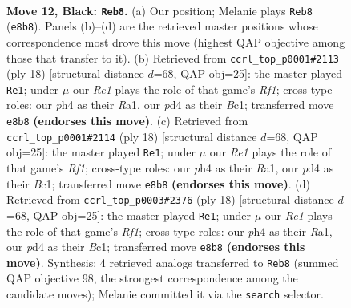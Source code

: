\documentclass[11pt]{article}
\begin{document}
\clearpage

\begin{figure}[p]\centering
\begin{subfigure}{0.46\textwidth}\centering
\resizebox{\linewidth}{!}{%
\newchessgame
\chessboard[
  setfen={r3r1k1/pppbqppp/2n1pn2/8/2BP3P/4PNP1/PP1B1P2/R2Q1RK1 b - - 2 12},
  showmover=false,
  pgfstyle=straightmove, color=movearrow, markmove={e8-b8}
]}
\caption{}
\end{subfigure}\hfill
\begin{subfigure}{0.46\textwidth}\centering
\resizebox{\linewidth}{!}{%
\newchessgame
\chessboard[
  setfen={r1bq1rk1/pp3pbp/n2p1np1/2pP4/8/2N2NP1/PPP2PBP/R1BQ1RK1 w - - 1 10},
  showmover=false,
  pgfstyle=straightmove, color=movearrow, markmove={f1-e1}
]}
\caption{}
\end{subfigure}
\\[4pt]
\begin{subfigure}{0.46\textwidth}\centering
\resizebox{\linewidth}{!}{%
\newchessgame
\chessboard[
  setfen={r1bq1rk1/pp3pbp/n2p1np1/2pP4/8/2N2NP1/PPP2PBP/R1BQ1RK1 w - - 1 10},
  showmover=false,
  pgfstyle=straightmove, color=movearrow, markmove={f1-e1}
]}
\caption{}
\end{subfigure}\hfill
\begin{subfigure}{0.46\textwidth}\centering
\resizebox{\linewidth}{!}{%
\newchessgame
\chessboard[
  setfen={r1bq1rk1/pp3pbp/n2p1np1/2pP4/8/2N2NP1/PPP2PBP/R1BQ1RK1 w - - 1 10},
  showmover=false,
  pgfstyle=straightmove, color=movearrow, markmove={f1-e1}
]}
\caption{}
\end{subfigure}
\caption{\textbf{Move 12, Black: \texttt{Reb8}.} (a) Our position; Melanie plays \texttt{Reb8} (\texttt{e8b8}). Panels (b)--(d) are the retrieved master positions whose correspondence most drove this move (highest QAP objective among those that transfer to it). (b) Retrieved from \texttt{ccrl\_top\_p0001\#2113} (ply 18) [structural distance $d$=68, QAP obj=25]: the master played \texttt{Re1}; under $\mu$ our \emph{Re1} plays the role of that game's \emph{Rf1}; cross-type roles: our \emph{p}h4 as their \emph{R}a1, our \emph{p}d4 as their \emph{B}c1; transferred move \texttt{e8b8} \textbf{(endorses this move)}. (c) Retrieved from \texttt{ccrl\_top\_p0001\#2114} (ply 18) [structural distance $d$=68, QAP obj=25]: the master played \texttt{Re1}; under $\mu$ our \emph{Re1} plays the role of that game's \emph{Rf1}; cross-type roles: our \emph{p}h4 as their \emph{R}a1, our \emph{p}d4 as their \emph{B}c1; transferred move \texttt{e8b8} \textbf{(endorses this move)}. (d) Retrieved from \texttt{ccrl\_top\_p0003\#2376} (ply 18) [structural distance $d$=68, QAP obj=25]: the master played \texttt{Re1}; under $\mu$ our \emph{Re1} plays the role of that game's \emph{Rf1}; cross-type roles: our \emph{p}h4 as their \emph{R}a1, our \emph{p}d4 as their \emph{B}c1; transferred move \texttt{e8b8} \textbf{(endorses this move)}. Synthesis: 4 retrieved analogs transferred to \texttt{Reb8} (summed QAP objective 98, the strongest correspondence among the candidate moves); Melanie committed it via the \texttt{search} selector.}
\label{fig:thought-m23}
\end{figure}
\end{document}
